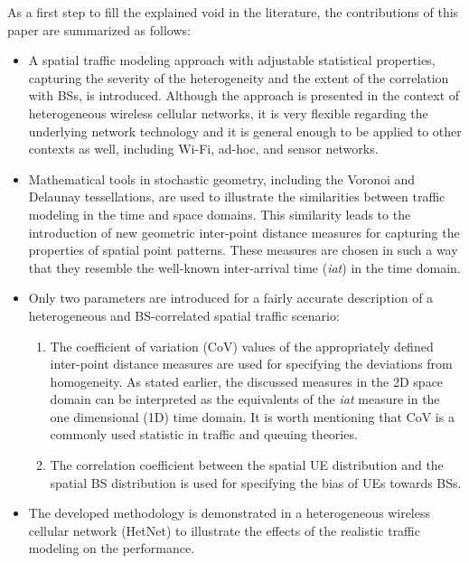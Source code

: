 \documentclass[journal]{IEEEtran}
\begin{document}
As a first step to fill the explained void in the literature, the contributions of this paper are summarized as follows:
\begin{itemize}
\item A spatial traffic modeling approach with adjustable statistical properties, capturing the severity of the heterogeneity and the extent of the correlation with BSs, is introduced. Although the approach is presented in the context of heterogeneous wireless cellular networks, it is very flexible regarding the underlying network technology and it is general enough to be applied to other contexts as well, including Wi-Fi, ad-hoc, and sensor networks.
\item Mathematical tools in stochastic geometry, including the Voronoi and Delaunay tessellations, are used to illustrate the similarities between traffic modeling in the time and space domains. This similarity leads to the introduction of new geometric inter-point distance measures for capturing the properties of spatial point patterns. These measures are chosen in such a way that they resemble the well-known inter-arrival time (\textit{iat}) in the time domain.
\item Only two parameters are introduced for a fairly accurate description of a heterogeneous and BS-correlated spatial traffic scenario:
\begin{enumerate}
\item The coefficient of variation (CoV) values of the appropriately defined inter-point distance measures are used for specifying the deviations from homogeneity. As stated earlier, the discussed measures in the 2D space domain can be interpreted as the equivalents of the \textit{iat} measure in the one dimensional (1D) time domain. It is worth mentioning that CoV is a commonly used statistic in traffic and queuing theories.
\item The correlation coefficient between the spatial UE distribution and the spatial BS distribution is used for specifying the bias of UEs towards BSs.
\end{enumerate}
\item The developed methodology is demonstrated in a heterogeneous wireless cellular network (HetNet) to illustrate the effects of the realistic traffic modeling on the performance.
\end{itemize}
\end{document}

